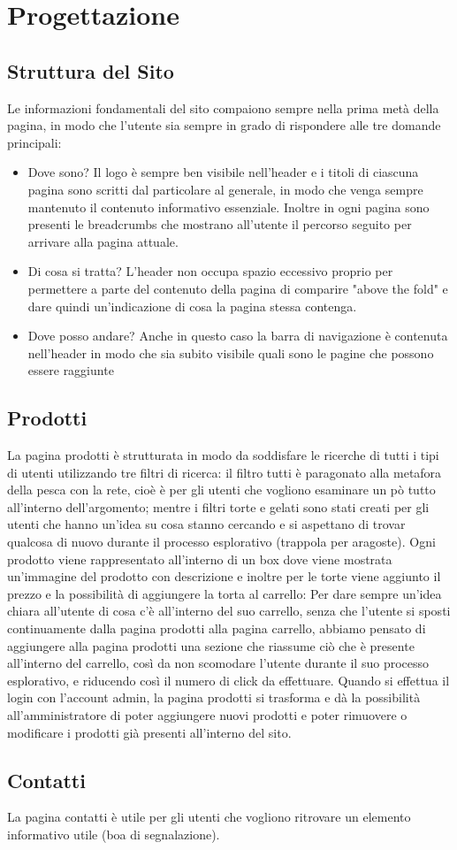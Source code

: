 \section{Progettazione}
    \subsection{Struttura del Sito}
		Le informazioni fondamentali del sito compaiono sempre nella prima metà della pagina, in modo che l'utente sia sempre in grado di rispondere alle tre domande principali:
		\begin{itemize}
			\item Dove sono? Il logo è sempre ben visibile nell'header e i titoli di ciascuna pagina sono scritti dal particolare al generale, in modo che venga sempre mantenuto il contenuto informativo essenziale. Inoltre in ogni pagina sono presenti le breadcrumbs che mostrano all'utente il percorso seguito per arrivare alla pagina attuale.
			\item Di cosa si tratta? L'header non occupa spazio eccessivo proprio per permettere a parte del contenuto della pagina di comparire "above the fold" e dare quindi un'indicazione di cosa la pagina stessa contenga.
			\item Dove posso andare? Anche in questo caso la barra di navigazione è contenuta nell'header in modo che sia subito visibile quali sono le pagine che possono essere raggiunte
		\end{itemize}
    \subsection{Prodotti}
		La pagina prodotti è strutturata in modo da soddisfare le ricerche di tutti i tipi di utenti utilizzando tre filtri di ricerca:
		il filtro tutti è paragonato alla metafora della pesca con la rete, cioè è per gli utenti che vogliono esaminare un pò tutto all’interno dell’argomento;
		mentre i filtri torte e gelati  sono stati creati per gli utenti che hanno un’idea su cosa stanno cercando e si aspettano di trovar qualcosa di nuovo durante il processo esplorativo (trappola per aragoste).
		Ogni prodotto viene rappresentato all’interno di un box dove viene mostrata un’immagine del prodotto con descrizione e inoltre per le torte viene aggiunto il prezzo e la possibilità di aggiungere la torta al carrello:
		Per dare sempre un’idea chiara all’utente di cosa c’è all’interno del suo carrello, senza che l’utente si sposti continuamente dalla pagina prodotti alla pagina carrello, abbiamo pensato di aggiungere alla pagina prodotti una sezione che riassume ciò che è presente all’interno del carrello, così da non scomodare l’utente durante il suo processo esplorativo, e riducendo così il numero di click da effettuare.
		Quando si effettua il login con l'account admin, la pagina prodotti si trasforma e dà la possibilità all’amministratore di poter aggiungere nuovi prodotti e poter rimuovere o modificare i prodotti già presenti all’interno del sito.
    \subsection{Contatti}
		La pagina contatti è utile per gli utenti che vogliono ritrovare un elemento informativo utile (boa di segnalazione).
